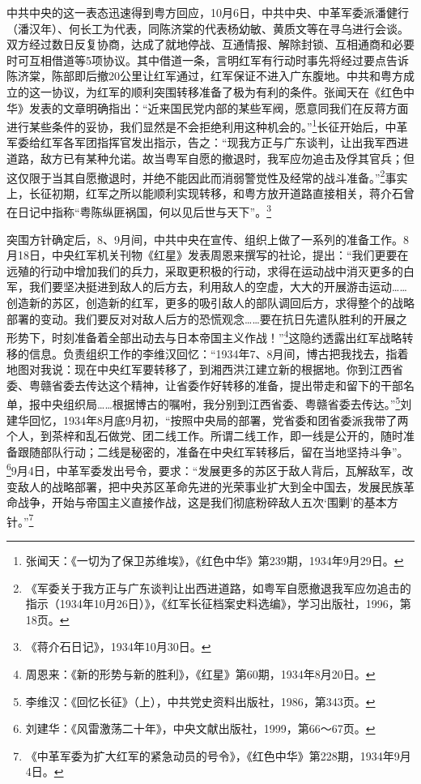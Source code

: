 中共中央的这一表态迅速得到粤方回应，10月6日，中共中央、中革军委派潘健行（潘汉年）、何长工为代表，同陈济棠的代表杨幼敏、黄质文等在寻乌进行会谈。双方经过数日反复协商，达成了就地停战、互通情报、解除封锁、互相通商和必要时可互相借道等5项协议。其中借道一条，言明红军有行动时事先将经过要点告诉陈济棠，陈部即后撤20公里让红军通过，红军保证不进入广东腹地。中共和粤方成立的这一协议，为红军的顺利突围转移准备了极为有利的条件。张闻天在《红色中华》发表的文章明确指出：“近来国民党内部的某些军阀，愿意同我们在反蒋方面进行某些条件的妥协，我们显然是不会拒绝利用这种机会的。”\footnote{张闻天：《一切为了保卫苏维埃》，《红色中华》第239期，1934年9月29日。}长征开始后，中革军委给红军各军团指挥官发出指示，告之：“现我方正与广东谈判，让出我军西进道路，敌方已有某种允诺。故当粤军自愿的撤退时，我军应勿追击及俘其官兵；但这仅限于当其自愿撤退时，并绝不能因此而消弱警觉性及经常的战斗准备。”\footnote{《军委关于我方正与广东谈判让出西进道路，如粤军自愿撤退我军应勿追击的指示（1934年10月26日）》，《红军长征档案史料选编》，学习出版社，1996，第18页。}事实上，长征初期，红军之所以能顺利实现转移，和粤方放开道路直接相关，蒋介石曾在日记中指称“粤陈纵匪祸国，何以见后世与天下”。\footnote{《蒋介石日记》，1934年10月30日。}


突围方针确定后，8、9月间，中共中央在宣传、组织上做了一系列的准备工作。8月18日，中央红军机关刊物《红星》发表周恩来撰写的社论，提出：“我们更要在远殖的行动中增加我们的兵力，采取更积极的行动，求得在运动战中消灭更多的白军，我们要坚决挺进到敌人的后方去，利用敌人的空虚，大大的开展游击运动……创造新的苏区，创造新的红军，更多的吸引敌人的部队调回后方，求得整个的战略部署的变动。我们要反对对敌人后方的恐慌观念……要在抗日先遣队胜利的开展之形势下，时刻准备着全部出动去与日本帝国主义作战！”\footnote{周恩来：《新的形势与新的胜利》，《红星》第60期，1934年8月20日。}这隐约透露出红军战略转移的信息。负责组织工作的李维汉回忆：“1934年7、8月间，博古把我找去，指着地图对我说：现在中央红军要转移了，到湘西洪江建立新的根据地。你到江西省委、粤赣省委去传达这个精神，让省委作好转移的准备，提出带走和留下的干部名单，报中央组织局……根据博古的嘱咐，我分别到江西省委、粤赣省委去传达。”\footnote{李维汉：《回忆长征》（上），中共党史资料出版社，1986，第343页。}刘建华回忆，1934年8月底9月初，“按照中央局的部署，党省委和团省委派我带了两个人，到茶梓和乱石做党、团二线工作。所谓二线工作，即一线是公开的，随时准备跟随部队行动；二线是秘密的，准备在中央红军转移后，留在当地坚持斗争”。\footnote{刘建华：《风雷激荡二十年》，中央文献出版社，1999，第66～67页。}9月4日，中革军委发出号令，要求：“发展更多的苏区于敌人背后，瓦解敌军，改变敌人的战略部署，把中央苏区革命先进的光荣事业扩大到全中国去，发展民族革命战争，开始与帝国主义直接作战，这是我们彻底粉碎敌人五次‘围剿’的基本方针。”\footnote{《中革军委为扩大红军的紧急动员的号令》，《红色中华》第228期，1934年9月4日。}



